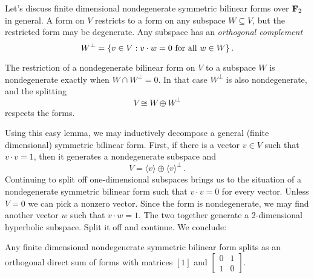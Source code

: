 Let's discuss finite dimensional 
nondegenerate symmetric bilinear forms over $\mathbf F_2$ in general.
A form on $V$ restricts to a form on any subspace $W\subseteq V$, but the 
restricted form may be degenerate. Any subspace has an 
{\em orthogonal complement} 
\[
W^\perp=\{v\in V:v\cdot w=0\,\,\hbox{for all}\,\,w\in W\} \,.
\]
\begin{lemma} The restriction of a nondegenerate bilinear form on $V$ to
a subspace $W$ is nondegenerate exactly when $W\cap W^\perp=0$. In that
case $W^\perp$ is also nondegenerate, and the splitting
\[
V\cong W\oplus W^\perp
\]
respects the forms. 
\end{lemma}
Using this easy lemma, we may inductively decompose a general (finite 
dimensional) symmetric bilinear form. First, if there is a vector $v\in V$
such that $v\cdot v=1$, then it generates a nondegenerate subspace and 
\[
V=\langle v\rangle\oplus\langle v\rangle^\perp\,.
\]
Continuing to split off one-dimensional subspaces brings us to the situation
of a nondegenerate symmetric bilinear form such that $v\cdot v=0$ for every
vector. Unless $V=0$ we can pick a nonzero vector. Since the form is
nondegenerate, we may find another vector $w$ such that $v\cdot w=1$. The
two together generate a 2-dimensional hyperbolic subspace. Split it off 
and continue. We conclude:
\begin{prop} Any finite dimensional nondegenerate symmetric bilinear form 
splits as an orthogonal direct sum of forms with matrices $[1]$ and 
$\left[\begin{array}{cc}0&1\\1&0\end{array}\right]$.
\end{prop}

